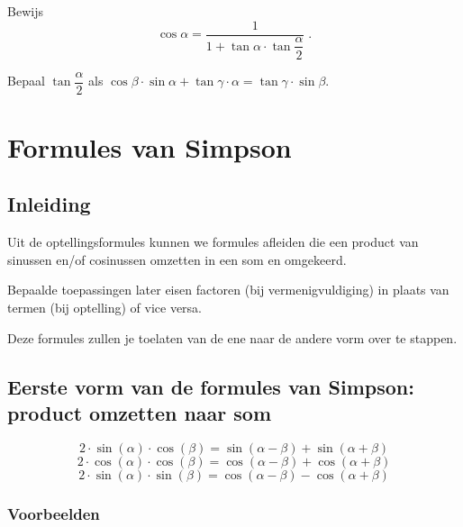 \documentclass[a4paper,12pt]{article}
\begin{document}
\begin{oefening}
Bewijs
$$\cos\alpha=\dfrac{1}{1+\tan\alpha\cdot\tan\dfrac{\alpha}{2}}\;.$$
\end{oefening}

\begin{oefening}
Bepaal $\tan\dfrac{\alpha}{2}$ als $\cos\beta\cdot\sin\alpha+\tan\gamma\cdot\alpha=\tan\gamma\cdot\sin\beta$.
\end{oefening}


\newpage
\section{Formules van Simpson}

\subsection{Inleiding}

Uit de optellingsformules kunnen we formules afleiden die een product van
sinussen en/of cosinussen omzetten in een som en omgekeerd.

Bepaalde toepassingen later eisen factoren (bij vermenigvuldiging) in plaats van
termen (bij optelling) of vice versa.

Deze formules zullen je toelaten van de ene naar de andere vorm over te stappen.

\subsection{Eerste vorm van de formules van Simpson: product omzetten naar som}
\[2\cdot \sin(\alpha)\cdot \cos(\beta)=\sin(\alpha-\beta)+\sin(\alpha+\beta)
\]
\[2\cdot \cos(\alpha)\cdot \cos(\beta)=\cos(\alpha-\beta)+\cos(\alpha+\beta)
\]
\[2\cdot \sin(\alpha)\cdot \sin(\beta)=\cos(\alpha-\beta)-\cos(\alpha+\beta)
\]

\subsubsection*{Voorbeelden}
\end{document}
